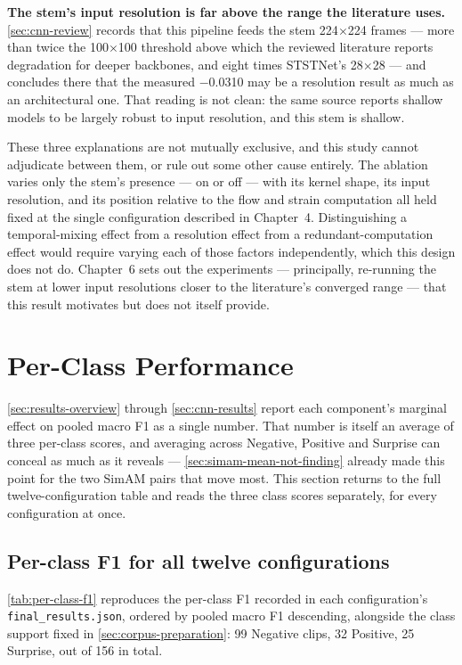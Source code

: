 \textbf{The stem's input resolution is far above the range the literature uses.} \autoref{sec:cnn-review} records that this pipeline feeds the stem 224$\times$224 frames --- more than twice the 100$\times$100 threshold above which the reviewed literature reports degradation for deeper backbones, and eight times STSTNet's 28$\times$28 --- and concludes there that the measured $-$0.0310 may be a resolution result as much as an architectural one. That reading is not clean: the same source reports shallow models to be largely robust to input resolution, and this stem is shallow.

These three explanations are not mutually exclusive, and this study cannot adjudicate between them, or rule out some other cause entirely. The ablation varies only the stem's presence --- on or off --- with its kernel shape, its input resolution, and its position relative to the flow and strain computation all held fixed at the single configuration described in Chapter~4. Distinguishing a temporal-mixing effect from a resolution effect from a redundant-computation effect would require varying each of those factors independently, which this design does not do. Chapter~6 sets out the experiments --- principally, re-running the stem at lower input resolutions closer to the literature's converged range --- that this result motivates but does not itself provide.


\section{Per-Class Performance}
\label{sec:per-class}

\autoref{sec:results-overview} through \autoref{sec:cnn-results} report each component's marginal effect on pooled macro F1 as a single number. That number is itself an average of three per-class scores, and averaging across Negative, Positive and Surprise can conceal as much as it reveals --- \autoref{sec:simam-mean-not-finding} already made this point for the two SimAM pairs that move most. This section returns to the full twelve-configuration table and reads the three class scores separately, for every configuration at once.

\subsection{Per-class F1 for all twelve configurations}
\label{sec:per-class-table}

\autoref{tab:per-class-f1} reproduces the per-class F1 recorded in each configuration's \texttt{final\_results.json}, ordered by pooled macro F1 descending, alongside the class support fixed in \autoref{sec:corpus-preparation}: 99 Negative clips, 32 Positive, 25 Surprise, out of 156 in total.

